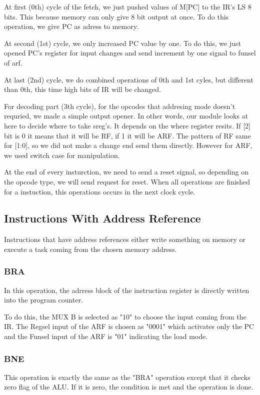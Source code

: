 \documentclass[pdftex,12pt,a4paper]{article}
\begin{document}
At first (0th) cycle of the fetch, we just pushed values of M[PC] to the IR's LS 8 bits.
This because memory can only give 8 bit output at once. To do this operation, we give PC
as adress to memory.

At second (1st) cycle, we only increased PC value by one. To do this, we just opened PC's
register for input changes and send increment by one signal to funsel of arf.

At last (2nd) cycle, we do combined operations of 0th and 1st cyles, but different than 0th,
this time high bits of IR will be changed.



For decoding part (3th cycle), for the opcodes that addresing mode doesn't requried, we made a simple output opener.
In other words, our module looks at here to decide where to take sreg's. It depends on the where register resits. If [2] bit
is 0 it means that it will be RF, if 1 it will be ARF. The pattern of RF same for [1:0], so we did not
make a change end send them directly. However for ARF, we used switch case for manipulation.


At the end of every insturction, we need to send a reset signal, so depending 
on the opcode type, we will send request for reset. When all operations are finished 
for a instuction, this operations occurs in the next clock cycle.






\subsection{Instructions With Address Reference}
Instructions that have address references either write something on memory or execute a task coming from the chosen 
memory address. 

\subsubsection{BRA}
In this operation, the adrress block of the instruction register is directly written into the program counter.

To do this, the MUX B is selected as "10" to choose the input coming from the IR. The Regsel 
input of the ARF is chosen as "0001" which activates only the PC and the Funsel input of the ARF is "01" indicating
the load mode.

\subsubsection{BNE}
This operation is exactly the same as the "BRA" operation except that it checks zero flag of the ALU. If it is zero,
the condition is met and the operation is done.
\end{document}
